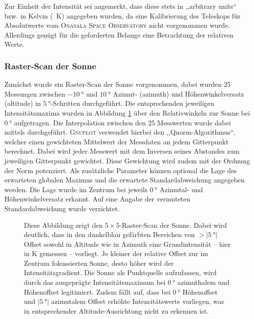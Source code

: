     Zur Einheit der Intensität sei angemerkt, dass diese stets in ,,arbitrary units`` bzw. in Kelvin (\SI{}{\kelvin}) angegeben wurden,
    da eine Kalibrierung des Teleskops für Absolutwerte vom \textsc{Onasala Space Observatory} nicht vorgenommen wurde.
    Allerdings genügt für die geforderten Belange eine Betrachtung der relativen Werte.\\

    \subsubsection{Raster-Scan der Sonne}
    Zunächst wurde ein Raster-Scan der Sonne vorgenommen, dabei wurden 25 Messungen zwischen $\SI{-10}{\degree}$ und $\SI{10}{\degree}$ Azimut- (azimuth) und Höhenwinkelversatz (altitude) in $\SI{5}{\degree}$-Schritten durchgeführt.
    Die entsprechenden jeweiligen Intensitätsmaxima wurden in Abbildung \ref{fig:Sonnenabbild} über den Relativwinkeln zur Sonne bei $\SI{0}{\degree}$ aufgetragen. Die Interpolation zwischen den 25 Messwerten wurde dabei mittels  durchgeführt. \textsc{Gnuplot} verwendet hierbei den ,,Qnorm-Algorithmus``, welcher einen gewichteten Mittelwert der Messdaten an jedem Gitterpunkt berechnet. Dabei wird jeder Messwert mit dem Inversen seines Abstandes zum jeweiligen Gitterpunkt gewichtet. Diese Gewichtung wird zudem mit der Ordnung der Norm potenziert. Als zusätzliche Parameter können optional die Lage des erwarteten globalen Maximus und die erwartete Standardabweichung angegeben werden. Die Lage wurde im Zentrum bei jeweils $\SI{0}{\degree}$ Azimutal- und Höhenwinkelversatz erkannt. Auf eine Angabe der vermuteten Standardabweichung wurde verzichtet.
    \begin{figure}[H]
        \centering
        
        \caption[Raster-Scan der Sonne]{Diese Abbildung zeigt den $5 \times 5$-Raster-Scan der Sonne. Dabei wird deutlich, dass in den dunkelblau gefärbten Bereichen von $>\vert \SI{5}{\degree}\vert$ Offset sowohl in Altitude wie in Azimuth eine Grundintensität -- hier in \si{\kelvin} gemessen -- vorliegt. Je kleiner der relative Offset zur im Zentrum fokussierten Sonne, desto höher wird der Intensitätsgradient. Die Sonne als Punktquelle aufzufassen, wird durch das ausgeprägte Intensitätsmaximum bei $\SI{0}{\degree}$ azimuthalem und Höhenoffset legitimiert. Zudem fällt auf, dass bei $\SI{0}{\degree}$ Höhenoffset und $\vert\SI{5}{\degree}\vert$ azimutalem Offset erhöhte Intensitätswerte vorliegen, was in entsprechender Altitude-Ausrichtung nicht zu erkennen ist.}
        \label{fig:Sonnenabbild}
    \end{figure}
